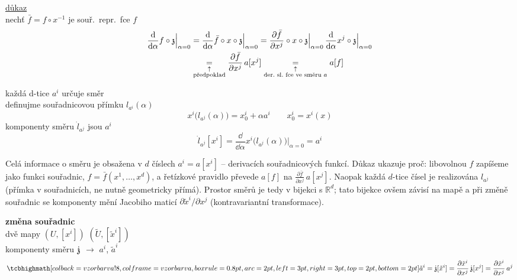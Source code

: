 \underline{důkaz} \\
\quad nechť $\bar f = f\circ x^{-1}$ je souř.\ repr.\ fce $f$
\begin{align*}
  \frac{\dd}{\dd\alpha}f\circ\mathfrak{z}\Big|_{\alpha=0}
  &= \frac{\dd}{\dd\alpha}\bar f\circ x\circ\mathfrak{z}\Big|_{\alpha=0}
   = \frac{\partial\bar f}{\partial x^j}\circ x\circ\mathfrak{z}\Big|_{\alpha=0}\,
     \frac{\dd}{\dd\alpha}x^j\circ\mathfrak{z}\Big|_{\alpha=0} \\
  &\underset{\substack{\uparrow\\ \text{předpoklad}}}{=} \frac{\partial\bar f}{\partial x^j}\,a[x^j]
   \underset{\substack{\uparrow\\ \text{der.\ sl.\ fce ve směru } a}}{=} a[f]
\end{align*}

každá d-tice $a^i$ určuje směr \\
\quad definujme souřadnicovou přímku $l_{a^i}(\alpha)$
\[
  x^i\big(l_{a^j}(\alpha)\big) = x_0^i + \alpha a^i \qquad x_0^i = x^i(x)
\]
\quad komponenty směru $\dot l_{a^j}$ jsou $a^i$
\[
  \dot l_{a^j}[x^i] = \frac{\dd}{\dd\alpha}x^i\big(l_{a^j}(\alpha)\big)\Big|_{\alpha=0} = a^i
\]

\begin{vysvetleni}
Celá informace o směru je obsažena v $d$ číslech $a^i=a[x^i]$ -- derivacích souřadnicových funkcí. Důkaz ukazuje proč: libovolnou $f$ zapíšeme jako funkci souřadnic, $f=\bar f(x^1,\dots,x^d)$, a řetízkové pravidlo převede $a[f]$ na $\frac{\partial\bar f}{\partial x^j}\,a[x^j]$. Naopak každá $d$-tice čísel je realizována  $l_{a^j}$ (přímka v souřadnicích, ne nutně geometricky přímá). Prostor směrů je tedy v bijekci s $\mathbb{R}^d$; tato bijekce ovšem závisí na mapě a při změně souřadnic se komponenty mění Jacobiho maticí $\partial\tilde x^i/\partial x^j$ (kontravariantní transformace).
\end{vysvetleni}

\textbf{změna souřadnic} \\
\quad dvě mapy \quad $(U,[x^i])$ \quad $(\tilde U,[\tilde x^i])$ \\
\quad komponenty směru $\dot{\mathfrak{z}}$ $\to$ $a^i$, $\tilde a^i$
\[
  \vzorec{\tilde a^i = \dot\gmItrikr[\tilde x^i] = \frac{\partial\tilde x^i}{\partial x^j}\,\dot\gmItrikr[x^j] = \frac{\partial\tilde x^i}{\partial x^j}\,a^j}
\]

